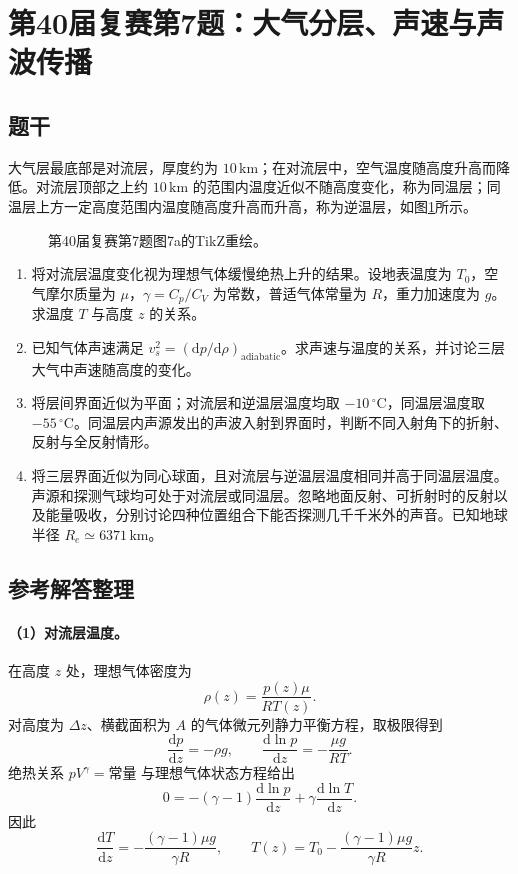 \section{第40届复赛第7题：大气分层、声速与声波传播}

\subsection{题干}

大气层最底部是对流层，厚度约为 $10\,\mathrm{km}$；在对流层中，空气温度随高度升高而降低。对流层顶部之上约 $10\,\mathrm{km}$ 的范围内温度近似不随高度变化，称为同温层；同温层上方一定高度范围内温度随高度升高而升高，称为逆温层，如图\ref{fig:cpho40q07}所示。

\begin{figure}[htbp]
  \centering
  
  \caption{第40届复赛第7题图7a的TikZ重绘。}
  \label{fig:cpho40q07}
\end{figure}

\begin{enumerate}
  \item 将对流层温度变化视为理想气体缓慢绝热上升的结果。设地表温度为 $T_0$，空气摩尔质量为 $\mu$，$\gamma=C_p/C_V$ 为常数，普适气体常量为 $R$，重力加速度为 $g$。求温度 $T$ 与高度 $z$ 的关系。
  \item 已知气体声速满足 $v_s^2=(\mathrm dp/\mathrm d\rho)_{\mathrm{adiabatic}}$。求声速与温度的关系，并讨论三层大气中声速随高度的变化。
  \item 将层间界面近似为平面；对流层和逆温层温度均取 $-10\,{}^\circ\mathrm C$，同温层温度取 $-55\,{}^\circ\mathrm C$。同温层内声源发出的声波入射到界面时，判断不同入射角下的折射、反射与全反射情形。
  \item 将三层界面近似为同心球面，且对流层与逆温层温度相同并高于同温层温度。声源和探测气球均可处于对流层或同温层。忽略地面反射、可折射时的反射以及能量吸收，分别讨论四种位置组合下能否探测几千千米外的声音。已知地球半径 $R_e\simeq6371\,\mathrm{km}$。
\end{enumerate}

\subsection{参考解答整理}

\paragraph{（1）对流层温度。}
在高度 $z$ 处，理想气体密度为
\[
\rho(z)=\frac{p(z)\mu}{RT(z)}.
\]
对高度为 $\Delta z$、横截面积为 $A$ 的气体微元列静力平衡方程，取极限得到
\[
\frac{\mathrm dp}{\mathrm dz}=-\rho g,
\qquad
\frac{\mathrm d\ln p}{\mathrm dz}=-\frac{\mu g}{RT}.
\]
绝热关系 $pV^\gamma=\text{常量}$ 与理想气体状态方程给出
\[
0=-(\gamma-1)\frac{\mathrm d\ln p}{\mathrm dz}
+\gamma\frac{\mathrm d\ln T}{\mathrm dz}.
\]
因此
\[
\frac{\mathrm dT}{\mathrm dz}=-\frac{(\gamma-1)\mu g}{\gamma R},
\qquad
T(z)=T_0-\frac{(\gamma-1)\mu g}{\gamma R}z.
\]

